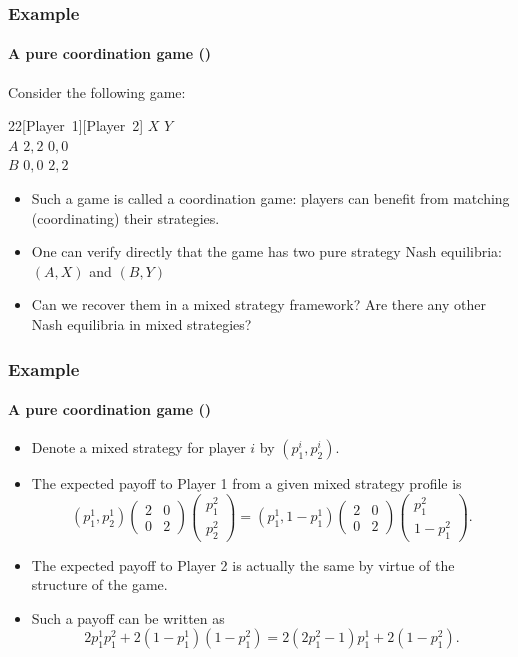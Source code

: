 \documentclass[10pt]{beamer}
\theoremstyle{definition}
\begin{document}
\begin{frame}[fragile]\setcounter{slidenum}{1}
\frametitle{Example }
\framesubtitle{A pure coordination game ()}
Consider the following game:
\begin{center}
\begin{game}{2}{2}[Player~1][Player~2]
 \> $ X $ \> $ Y $ \\
$ A $ \> $ 2,2 $ \> $ 0,0 $ \\
$ B $ \> $ 0,0 $ \> $ 2,2 $
\end{game}
\end{center}\bigskip

\begin{itemize}\itemsep1em
\item Such a game is called a coordination game: players can benefit from matching (coordinating) their strategies.
\item One can verify directly that the game has two pure strategy Nash equilibria: $ (A,X) $ and $ (B,Y) $
\item Can we recover them in a mixed strategy framework? Are there any other Nash equilibria in mixed strategies?
\end{itemize}
\end{frame}

\begin{frame}[fragile]
\frametitle{Example }
\framesubtitle{A pure coordination game ()}
\begin{itemize}\itemsep1em
\item Denote a mixed strategy for player $ i $ by $ (p_1^i,p_2^i) $.
\item The expected payoff to Player 1 from a given mixed strategy profile is
\[ (p^1_1,p^1_2)\begin{pmatrix}
2 & 0\\
0 & 2
\end{pmatrix}\begin{pmatrix}
p^2_1 \\
p^2_2
\end{pmatrix} = (p^1_1,1-p^1_1)\begin{pmatrix}
2 & 0\\
0 & 2
\end{pmatrix}\begin{pmatrix}
p^2_1 \\
1-p^2_1
\end{pmatrix}.\]
\item The expected payoff to Player 2 is actually the same by virtue of the structure of the game.
\item Such a payoff can be written as \[ 2p^1_1p^2_1 + 2 (1-p^1_1)(1-p^2_1) = 2(2p_1^2 -1)p_1^1 + 2(1-p^2_1). \]
\end{itemize}
\end{frame}
\end{document}
